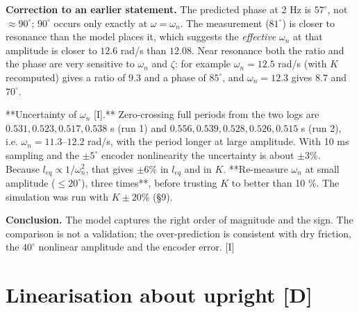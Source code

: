 \documentclass[11pt,a4paper]{article}
\begin{document}
\textbf{Correction to an earlier statement.} The predicted phase at 2 Hz is $57^\circ$, not $\approx90^\circ$; $90^\circ$ occurs only exactly at $\omega=\omega_n$. The measurement ($81^\circ$) is closer to resonance than the model places it, which suggests the \emph{effective} $\omega_n$ at that amplitude is closer to $12.6$ rad/s than $12.08$. Near resonance both the ratio and the phase are very sensitive to $\omega_n$ and $\zeta$: for example $\omega_n=12.5$ rad/s (with $K$ recomputed) gives a ratio of $9.3$ and a phase of $85^\circ$, and $\omega_n=12.3$ gives $8.7$ and $70^\circ$.

**Uncertainty of $\omega_n$ [I].** Zero-crossing full periods from the two logs are $0.531,0.523,0.517,0.538$ s (run 1) and $0.556,0.539,0.528,0.526,0.515$ s (run 2), i.e. $\omega_n=11.3$–$12.2$ rad/s, with the period longer at large amplitude. With 10 ms sampling and the $\pm5^\circ$ encoder nonlinearity the uncertainty is about $\pm3\%$. Because $l_{eq}\propto1/\omega_n^2$, that gives $\pm6\%$ in $l_{eq}$ and in $K$. **Re-measure $\omega_n$ at small amplitude ($\le20^\circ$), three times**, before trusting $K$ to better than 10 \%. The simulation was run with $K\pm20\%$ (§9).

\textbf{Conclusion.} The model captures the right order of magnitude and the sign. The comparison is not a validation; the over-prediction is consistent with dry friction, the $40^\circ$ nonlinear amplitude and the encoder error. [I]


\section{Linearisation about upright [D]}
\end{document}
